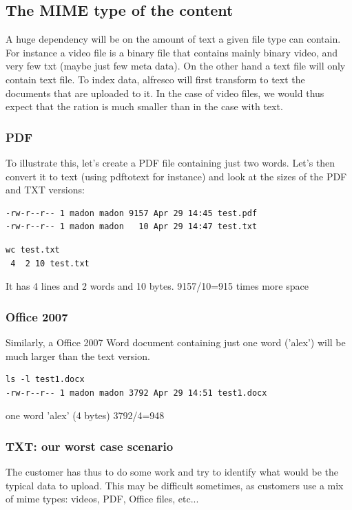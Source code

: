 \documentclass[12pt,a4]{article}
\begin{document}
\subsection{The MIME type of the content}

A huge dependency will be on the amount of text a given file type can contain.
For instance a video file is a binary file that contains mainly binary video, and very few txt (maybe just few meta data).
On the other hand a text file will only contain text file.
To index data, alfresco will first transform to text the documents that are uploaded to it.
In the case of video files, we would thus expect that the ration is much smaller than in the case with text.

\subsubsection{PDF}
To illustrate this, let's create a PDF file containing just two words. Let's then convert it to text (using pdftotext for instance) and look at the sizes of the PDF and TXT versions:

\begin{verbatim}
-rw-r--r-- 1 madon madon 9157 Apr 29 14:45 test.pdf
-rw-r--r-- 1 madon madon   10 Apr 29 14:47 test.txt
\end{verbatim}

\begin{verbatim}
wc test.txt
 4  2 10 test.txt
\end{verbatim}
It has 4 lines and 2 words and 10 bytes.
9157/10=915 times more space

\subsubsection{Office 2007}
Similarly, a Office 2007 Word document containing just one word ('alex') will be much larger than the text version.
\begin{verbatim}
ls -l test1.docx
-rw-r--r-- 1 madon madon 3792 Apr 29 14:51 test1.docx
\end{verbatim}
one word 'alex' (4 bytes)
3792/4=948

\subsubsection{TXT: our worst case scenario}
The customer has thus to do some work and try to identify what would be the typical data to upload.
This may be difficult sometimes, as customers use a mix of mime types: videos, PDF, Office files, etc...
\end{document}
